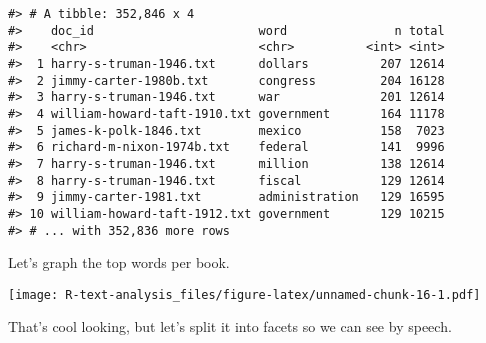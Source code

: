 \documentclass[]{book}
\newenvironment{Shaded}{\begin{snugshade}}{\end{snugshade}}
\newcommand{\DataTypeTok}[1]{\textcolor[rgb]{0.13,0.29,0.53}{#1}}
\newcommand{\DecValTok}[1]{\textcolor[rgb]{0.00,0.00,0.81}{#1}}
\newcommand{\KeywordTok}[1]{\textcolor[rgb]{0.13,0.29,0.53}{\textbf{#1}}}
\newcommand{\NormalTok}[1]{#1}
\newcommand{\OperatorTok}[1]{\textcolor[rgb]{0.81,0.36,0.00}{\textbf{#1}}}
\newcommand{\OtherTok}[1]{\textcolor[rgb]{0.56,0.35,0.01}{#1}}
\newcommand{\StringTok}[1]{\textcolor[rgb]{0.31,0.60,0.02}{#1}}
\begin{document}
\begin{verbatim}
#> # A tibble: 352,846 x 4
#>    doc_id                       word               n total
#>    <chr>                        <chr>          <int> <int>
#>  1 harry-s-truman-1946.txt      dollars          207 12614
#>  2 jimmy-carter-1980b.txt       congress         204 16128
#>  3 harry-s-truman-1946.txt      war              201 12614
#>  4 william-howard-taft-1910.txt government       164 11178
#>  5 james-k-polk-1846.txt        mexico           158  7023
#>  6 richard-m-nixon-1974b.txt    federal          141  9996
#>  7 harry-s-truman-1946.txt      million          138 12614
#>  8 harry-s-truman-1946.txt      fiscal           129 12614
#>  9 jimmy-carter-1981.txt        administration   129 16595
#> 10 william-howard-taft-1912.txt government       129 10215
#> # ... with 352,836 more rows
\end{verbatim}

Let's graph the top words per book.

\begin{Shaded}
\end{Shaded}

\texttt{[image: R-text-analysis\_files/figure-latex/unnamed-chunk-16-1.pdf]}

That's cool looking, but let's split it into facets so we can see by speech.

\begin{Shaded}
\end{Shaded}
\end{document}
